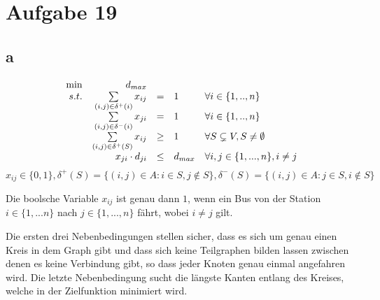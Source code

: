 \documentclass[10pt]{article}
\begin{document}
  \section*{Aufgabe 19}
    \subsection*{a}
      \begin{displaymath}
        \begin{array}{ r r c l l }
          \min & d_{max} & & & \\
          s.t. & \sum\limits_{(i,j)\in \delta^{+}(i)} x_{ij} & = & 1 & \forall 
            i\in \{1,..,n\}\\
               & \sum\limits_{(i,j)\in \delta^{-}(i)} x_{ji} & = & 1 & \forall 
            i\in \{1,..,n\}\\
            & \sum\limits_{(i,j)\in \delta^{+}(S)} x_{ij} & \geq &  1 & \forall
            S\subsetneq V, S\neq \emptyset \\
               & x_{ji}\cdot d_{ji} &\leq& d_{max} & \forall i,j \in
            \{1,...,n\}, i\neq j \\
        \end{array}
      \end{displaymath}
      \begin{displaymath}
        x_{ij}\in\{0,1\}, \delta^{+}(S)=\{(i,j)\in A:i\in S, j\not\in S\},
        \delta^{-}(S)=\{(i,j)\in A:j\in S, i\not\in S\}
      \end{displaymath}

      Die boolsche Variable $x_{ij}$ ist genau dann $1$, wenn ein Bus von der
      Station $i\in \{1,...n\}$ nach $j \in \{1,...,n\}$ fährt, wobei $i\neq j$
      gilt.


      Die ersten drei Nebenbedingungen stellen sicher, dass es sich um genau
      einen Kreis in dem Graph gibt und dass sich keine Teilgraphen bilden
      lassen zwischen denen es keine Verbindung gibt, so dass jeder Knoten genau
      einmal angefahren wird.
      Die letzte Nebenbedingung sucht die längste Kanten entlang des Kreises,
      welche in der Zielfunktion minimiert wird.

\end{document}
